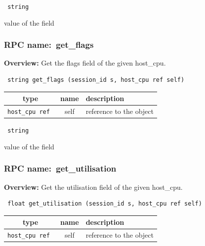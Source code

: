 \vspace{0.3cm}

{\tt 
string
}


value of the field
\vspace{0.3cm}
\vspace{0.3cm}
\vspace{0.3cm}
\subsubsection{RPC name:~get\_flags}

{\bf Overview:} 
Get the flags field of the given host\_cpu.

\begin{verbatim} string get_flags (session_id s, host_cpu ref self)\end{verbatim}



 
\vspace{0.3cm}
\begin{tabular}{|c|c|p{7cm}|}
 \hline
{\bf type} & {\bf name} & {\bf description} \\ \hline
{\tt host\_cpu ref } & self & reference to the object \\ \hline 

\end{tabular}

\vspace{0.3cm}

{\tt 
string
}


value of the field
\vspace{0.3cm}
\vspace{0.3cm}
\vspace{0.3cm}
\subsubsection{RPC name:~get\_utilisation}

{\bf Overview:} 
Get the utilisation field of the given host\_cpu.

\begin{verbatim} float get_utilisation (session_id s, host_cpu ref self)\end{verbatim}



 
\vspace{0.3cm}
\begin{tabular}{|c|c|p{7cm}|}
 \hline
{\bf type} & {\bf name} & {\bf description} \\ \hline
{\tt host\_cpu ref } & self & reference to the object \\ \hline 

\end{tabular}

